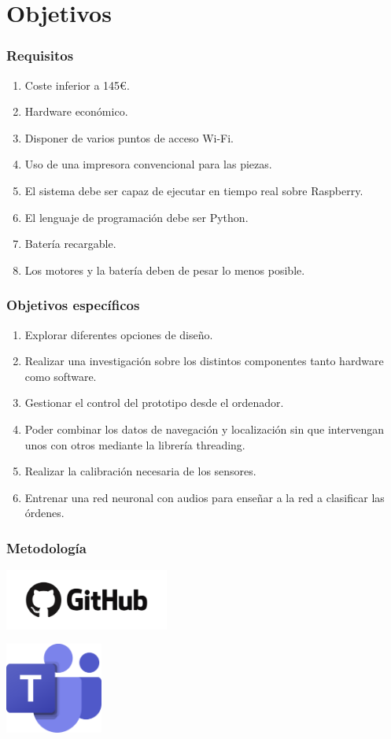 \documentclass{beamer}
\begin{document}
\section{Objetivos}
\begin{frame}
\frametitle{Requisitos}
\begin{enumerate}
\item Coste inferior a 145€.
\item Hardware económico.
\item Disponer de varios puntos de acceso Wi-Fi.
\item Uso de una impresora convencional para las piezas.
\item El sistema debe ser capaz de ejecutar en tiempo real sobre Raspberry.
\item El lenguaje de programación debe ser Python.
\item Batería recargable.
\item Los motores y la batería deben de pesar lo menos posible.
\end{enumerate}
\end{frame}

\begin{frame}
\frametitle{Objetivos específicos}
\begin{enumerate}
\item Explorar diferentes opciones de diseño.
\item Realizar una investigación sobre los distintos componentes tanto hardware como software.
\item Gestionar el control del prototipo desde el ordenador.
\item Poder combinar los datos de navegación y localización sin que intervengan
unos con otros mediante la librería threading.
\item Realizar la calibración necesaria de los sensores.
\item Entrenar una red neuronal con audios para enseñar a la red
a clasificar las órdenes.
\end{enumerate}
\end{frame}

\begin{frame}
\frametitle{Metodología}
\centering
\begin{minipage}{0.45\textwidth}
    \centering
    \includegraphics[width=5.4cm]{figs/git.png}
\end{minipage}
\hfill
\begin{minipage}{0.45\textwidth}
    \centering
    \includegraphics[width=3.2cm]{figs/teams.png}
\end{minipage}
\end{frame}
\end{document}

